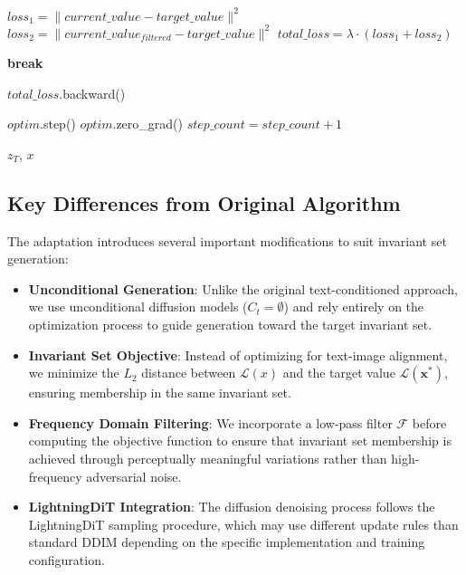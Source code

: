 \begin{algorithm}[H]
\begin{algorithmic}[1]
    \State $loss_1 = \|current\_value - target\_value\|^2$ 
    \State $loss_2 = \|current\_value_{filtered} - target\_value\|^2$ 
    \State $total\_loss = \lambda \cdot (loss_1 + loss_2)$ 
    
     
        \State \textbf{break} 
    \EndIf
    
    \State $total\_loss$.backward() 
    
    \State $optim$.step() 
    \State $optim$.zero\_grad() 
    \State $step\_count = step\_count + 1$ 
\EndWhile

\State \Return $z_T$, $x$ 
\end{algorithmic}
\end{algorithm}

\subsection{Key Differences from Original Algorithm}

The adaptation introduces several important modifications to suit invariant set generation:

\begin{itemize}
    \item \textbf{Unconditional Generation}: Unlike the original text-conditioned approach, we use unconditional diffusion models ($C_t = \emptyset$) and rely entirely on the optimization process to guide generation toward the target invariant set.
    
    \item \textbf{Invariant Set Objective}: Instead of optimizing for text-image alignment, we minimize the $L_2$ distance between $\mathcal{L}(x)$ and the target value $\mathcal{L}(\mathbf{x^*})$, ensuring membership in the same invariant set.
    
    \item \textbf{Frequency Domain Filtering}: We incorporate a low-pass filter $\mathcal{F}$ before computing the objective function to ensure that invariant set membership is achieved through perceptually meaningful variations rather than high-frequency adversarial noise.
    
    \item \textbf{LightningDiT Integration}: The diffusion denoising process follows the LightningDiT sampling procedure, which may use different update rules than standard DDIM depending on the specific implementation and training configuration.
\end{itemize}

